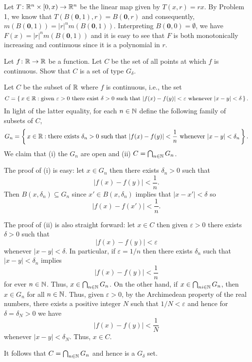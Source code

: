 \begin{solution}
  Let \(T\colon\mathbb{R}^n\times[0,x)\to\mathbb{R}^n\) be the linear map given by
  \(T(x,r)=rx\). By Problem 1, we know that
  \(T(B(\mathbf{0},1),r)=B(\mathbf{0},r)\) and consequently,
  \(m(B(\mathbf{0},1))=|r|^nm(B(\mathbf{0},1))\). Interpreting
  \(B(\mathbf{0},0)=\emptyset\), we have \(F(x)=|r|^nm(B(\mathbf{0},1))\)
  and it is easy to see that \(F\) is both monotonically increasing and
  continuous since it is a polynomial in \(r\).
\end{solution}

\begin{problem}
  Let \(f\colon\mathbb{R}\to\mathbb{R}\) be a function. Let \(C\) be the set of all
  points at which \(f\) is continuous. Show that \(C\) is a set of type
  \(G_\delta\).
\end{problem}
\begin{solution}
  Let \(C\) be the subset of \(\mathbb{R}\) where \(f\) is continuous, i.e., the
  set
  \[
    C=\left\{\,x\in\mathbb{R}:\text{given \(\varepsilon>0\) there exist
        \(\delta>0\) such that \(|f(x)-f(y)|<\varepsilon\) whenever
      \(|x-y|<\delta\)}\,\right\}.
  \]
  In light of the latter equality, for each \(n\in\mathbb{N}\) define the
  following family of subsets of \(C\),
  \[
    G_n=\left\{\,x\in\mathbb{R}:\text{there exists \(\delta_n>0\) such that
        \(|f(x)-f(y)|<\frac{1}{n}\) whenever \(|x-y|<\delta_n\)}\,\right\}.
  \]
  We claim that (i) the \(G_n\) are open and (ii)
  \(C=\bigcap_{n\in\mathbb{N}}G_n\).

  The proof of (i) is easy: let \(x\in G_n\) then there exists
  \(\delta_n>0\) such that
  \[
    |f(x)-f(y)|<\frac{1}{n}.
  \]
  Then \(B(x,\delta_n)\subseteq G_n\) since \(x'\in B(x,\delta_n)\) implies
  that \(|x-x'|<\delta\) so
  \[
    |f(x)-f(x')|<\frac{1}{n}.
  \]

  The proof of (ii) is also straight forward: let \(x\in C\) then given
  \(\varepsilon>0\) there exists \(\delta>0\) such that
  \[
    |f(x)-f(y)|<\varepsilon
  \]
  whenever \(|x-y|<\delta\). In particular, if \(\varepsilon=1/n\) then
  there exists \(\delta_n\) such that \(|x-y|<\delta_n\) implies
  \[
    |f(x)-f(y)|<\frac{1}{n}
  \]
  for ever \(n\in\mathbb{N}\). Thus, \(x\in\bigcap_{n\in\mathbb{N}} G_n\). On the other
  hand, if \(x\in\bigcap_{ni\in\mathbb{N}} G_n\), then \(x\in G_n\) for all
  \(n\in\mathbb{N}\). Thus, given \(\varepsilon>0\), by the Archimedean property
  of the real numbers, there exists a positive integer \(N\) such that
  \(1/N<\varepsilon\) and hence for \(\delta=\delta_N>0\) we have
  \[
    |f(x)-f(y)|<\frac{1}{N}
  \]
  whenever \(|x-y|<\delta_N\). Thus, \(x\in C\).

  It follows that \(C=\bigcap_{n\in\mathbb{N}} G_n\) and hence is a \(G_\delta\)
  set.
\end{solution}

